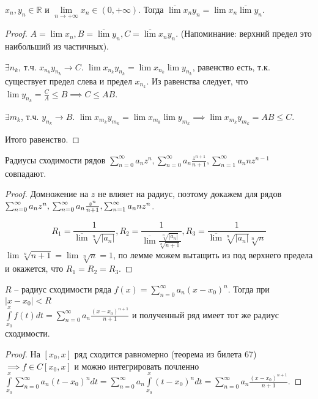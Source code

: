 \begin{lemma} \thmslashn

	$x_n, y_n \in \mathbb{R}$ и $\lim\limits_{n\to+\infty}x_n \in (0, +\infty)$. Тогда $\overline{\lim}x_ny_n = \lim x_n\overline{\lim}y_n$. 
	\begin{proof} \thmslashn
		
		$A = \lim x_n, B = \overline{\lim}y_n, C = \overline{\lim}x_ny_n$. (Напоминание: верхний предел это наибольший из частичных).
		
		$\exists n_k$, т.ч. $x_{n_k}y_{n_k} \to C$. $\lim x_{n_k}y_{n_k} = \lim x_{n_k} \lim y_{n_k}$, равенство есть, т.к. существует предел слева и предел $x_{n_k}$. Из равенства следует, что $\lim y_{n_k} = \frac{C}{A} \leq B \implies C \leq AB$.
		
		$\exists m_k$, т.ч. $y_{n_k} \to B$. $\lim x_{m_k}y_{m_k} = \lim x_{m_k} \lim y_{m_k} \implies \lim x_{m_k}y_{m_k} = AB \leq C$. 
		
		Итого равенство.
	\end{proof}
\end{lemma}

\begin{consequence} \thmslashn

	Радиусы сходимости рядов $\sum_{n = 0}^{\infty}a_nz^n, \sum_{n = 0}^{\infty}a_n\frac{z^{n + 1}}{n + 1}, \sum_{n = 1}^{\infty}a_nnz^{n - 1}$ совпадают.
	\begin{proof} \thmslashn
		
		Домножение на $z$ не влияет на радиус, поэтому докажем для рядов 
		$\sum_{n = 0}^{\infty}a_nz^n,\\ \sum_{n = 0}^{\infty}a_n\frac{z^{n}}{n + 1}, \sum_{n = 1}^{\infty}a_nnz^{n}$.
		
		\[
		R_1 = \frac{1}{\overline{\lim}\sqrt[n]{|a_n|}}, R_2 = \frac{1}{\overline{\lim}\frac{\sqrt[n]{|a_n|}}{\sqrt[n]{n + 1}}}, R_3 = \frac{1}{\overline{\lim}\sqrt[n]{|a_n|}\sqrt[n]{n}}
		\]
		$\lim\sqrt[n]{n + 1} = \lim\sqrt[n]{n} = 1$, по лемме можем вытащить из под верхнего предела и окажется, что $R_1 = R_2 = R_3$.
	\end{proof}
\end{consequence}

\begin{theorem} \thmslashn

$R$ -- радиус сходимости ряда $f(x) = \sum_{n = 0}^{\infty}a_n(x - x_0)^n$. Тогда при $|x - x_0| < R$\\ $\int\limits_{x_0}^{x}f(t)dt = \sum_{n = 0}^{\infty}a_n\frac{(x - x_0)^{n + 1}}{n + 1}$ и полученный ряд имеет тот же радиус сходимости.
\begin{proof} \thmslashn
	
	На $[x_0, x]$ ряд сходится равномерно (теорема из билета 67)$\implies f \in C[x_0, x]$ и можно интегрировать почленно $\int\limits_{x_0}^{x}\sum_{n = 0}^{\infty}a_n(t - x_0)^ndt = \sum_{n = 0}^{\infty}a_n\int\limits_{x_0}^{x}(t - x_0)^ndt = \sum_{n = 0}^{\infty}a_n\frac{(x - x_0)^{n + 1}}{n + 1}$.
\end{proof}
\end{theorem}